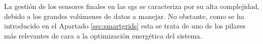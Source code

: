 \vspace{3mm}






La gestión de los sensores finales en las \gls{sg}s se caracteriza por su alta complejidad, debido a los grandes volúmenes de datos a manejar. No obstante, como se ha introducido en el Apartado \ref{sec:smartgrids} esta se trata de uno de los pilares más relevantes de cara a la optimización energética del sistema.

